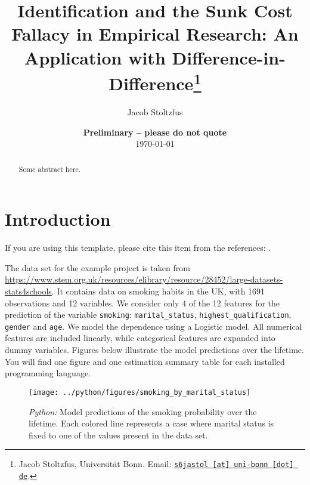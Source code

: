 \documentclass[11pt, a4paper, leqno]{article}
\begin{document}
\title{Identification and the Sunk Cost Fallacy in Empirical Research: An Application with Difference-in-Difference\thanks{Jacob Stoltzfus, Universität Bonn. Email: \href{mailto:s6jastol@uni-bonn.de}{\nolinkurl{s6jastol [at] uni-bonn [dot] de}}.}}

\author{Jacob Stoltzfus}

\date{
    {\bf Preliminary -- please do not quote}
    \\[1ex]
    \today
}

\maketitle


\begin{abstract}
    Some abstract here.
\end{abstract}

\clearpage


\section{Introduction} %
\label{sec:introduction}

If you are using this template, please cite this item from the references:
\citet{GaudeckerEconProjectTemplates}.

The data set for the example project is taken from
\url{https://www.stem.org.uk/resources/elibrary/resource/28452/large-datasets-stats4schools}.
It contains data on smoking habits in the UK, with 1691 observations and 12 variables.
We consider only 4 of the 12 features for the prediction of the variable
\texttt{smoking}: \texttt{marital\_status}, \texttt{highest\_qualification},
\texttt{gender} and \texttt{age}. We model the dependence using a Logistic model. All
numerical features are included linearly, while categorical features are expanded into
dummy variables. Figures below illustrate the model predictions over the lifetime. You
will find one figure and one estimation summary table for each installed programming
language.



\begin{figure}[H]

    \centering
    \texttt{[image: ../python/figures/smoking\_by\_marital\_status]}

    \caption{\emph{Python:} Model predictions of the smoking probability over the
        lifetime. Each colored line represents a case where marital status is fixed to one
        of the values present in the data set.}
    \label{fig:python-predictions}

\end{figure}
\end{document}
